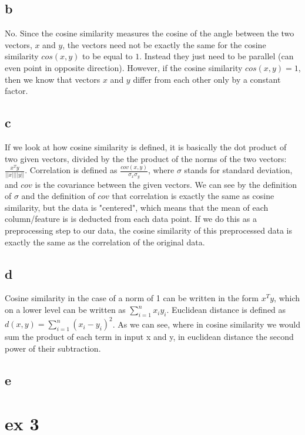 \documentclass{article}
\begin{document}
\subsection{b}
No. Since the cosine similarity measures the cosine of the angle between the two vectors, $x$ and $y$, the vectors need not be exactly the same for the cosine similarity $cos(x,y)$ to be equal to $1$. Instead they just need to be parallel (can even point in opposite direction). However, if the cosine similarity $cos(x,y) = 1$, then we know that vectors $x$ and $y$ differ from each other only by a constant factor.

\subsection{c}
If we look at how cosine similarity is defined, it is basically the dot product of two given vectors, divided by the the product of the norms of the two vectors: $\frac{x^Ty}{||x|| ||y||}$. Correlation is defined as $\frac{cov(x, y)}{\sigma_x \sigma_y}$, where $\sigma$ stands for standard deviation, and $cov$ is the covariance between the given vectors. We can see by the definition of $\sigma$ and the definition of $cov$ that correlation is exactly the same as cosine similarity, but the data is "centered", which means that the mean of each column/feature is is deducted from each data point. If we do this as a preprocessing step to our data, the cosine similarity of this preprocessed data is exactly the same as the correlation of the original data. 

\subsection{d}
Cosine similarity in the case of a norm of 1 can be written in the form $x^T y$, which on a lower level can be written as $\sum_{i=1}^{n} x_i  y_i$. Euclidean distance is defined as $d(x,y) = \sum_{i=1}^{n} (x_i - y_i)^2$. As we can see, where in cosine similarity we would sum the product of each term in input x and y, in euclidean distance the second power of their subtraction. 

\subsection{e}

\section{ex 3}
\end{document}
